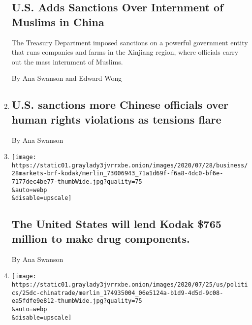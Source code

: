\begin{enumerate}
{  \subsection{U.S. Adds Sanctions Over Internment of Muslims in
  China}\label{us-adds-sanctions-over-internment-of-muslims-in-china}}

  The Treasury Department imposed sanctions on a powerful government
  entity that runs companies and farms in the Xinjiang region, where
  officials carry out the mass internment of Muslims.

  By Ana Swanson and Edward Wong
\item
  \href{/live/2020/07/31/business/stock-market-today-coronavirus/us-sanctions-more-chinese-officials-over-human-rights-violations-as-tensions-flare}{}

  \hypertarget{us-sanctions-more-chinese-officials-over-human-rights-violations-as-tensions-flare}{%
  \subsection{U.S. sanctions more Chinese officials over human rights
  violations as tensions
  flare}\label{us-sanctions-more-chinese-officials-over-human-rights-violations-as-tensions-flare}}

  By Ana Swanson
\item
  \href{/live/2020/07/28/business/stock-market-today-coronavirus/the-united-states-will-lend-kodak-765-million-to-make-drug-components}{}

  \texttt{[image: https://static01.graylady3jvrrxbe.onion/images/2020/07/28/business/28markets-brf-kodak/merlin\_73006943\_71a1d69f-f6a8-4dc0-bf6e-7177dec4be77-thumbWide.jpg?quality=75\\\&auto=webp\\\&disable=upscale]}

  \hypertarget{the-united-states-will-lend-kodak-765-million-to-make-drug-components}{%
  \subsection{The United States will lend Kodak \$765 million to make
  drug
  components.}\label{the-united-states-will-lend-kodak-765-million-to-make-drug-components}}

  By Ana Swanson
\item
  \href{/2020/07/25/business/economy/us-china-trade-diplomacy.html}{}

  \texttt{[image: https://static01.graylady3jvrrxbe.onion/images/2020/07/25/us/politics/25dc-chinatrade/merlin\_174935004\_06e5124a-b1d9-4d5d-9c08-ea5fdfe9e812-thumbWide.jpg?quality=75\\\&auto=webp\\\&disable=upscale]}


\end{enumerate}
